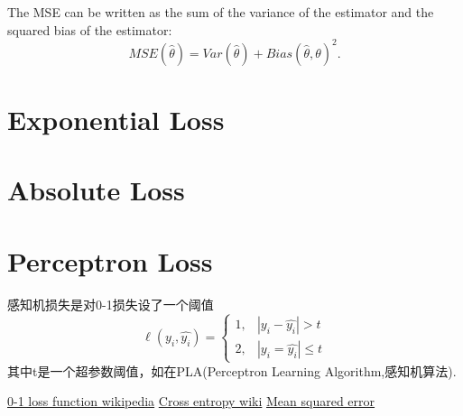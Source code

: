 \documentclass[hyperref, UTF-8]{ctexart}
\begin{document}
The MSE can be written as the sum of the variance of the estimator and the
squared bias of the estimator:
\begin{displaymath}
{MSE} ({\hat {\theta }})= {Var} ({\hat {\theta }})+ {Bias} ({\hat {\theta }},\theta )^{2}.  
\end{displaymath}
\section{Exponential Loss}

\section{Absolute Loss}

\section{Perceptron Loss}
感知机损失是对0-1损失设了一个阈值
\begin{displaymath}
  \ell{( y_i, \hat{y_i} )} = \left\{
      \begin{array}{ll}
        1,&|y_i - \hat{y_i}| > t \\
        2,& |{y_i = \hat{y_i}}| \leq t
      \end{array} 
\right.
\end{displaymath}
其中t是一个超参数阈值，如在PLA(Perceptron Learning Algorithm,感知机算法).

\begin{thebibliography}{99}
  \href{https://en.wikipedia.org/wiki/Loss_function#0-1_loss_function}{0-1 loss
    function wikipedia}
  \href{https://en.wikipedia.org/wiki/Cross_entropy#Cross-entropy_error_function_and_logistic_regression}{Cross
    entropy wiki}
 \href{https://en.wikipedia.org/wiki/Mean_squared_error}{Mean squared error}
\end{thebibliography}
\end{document}

